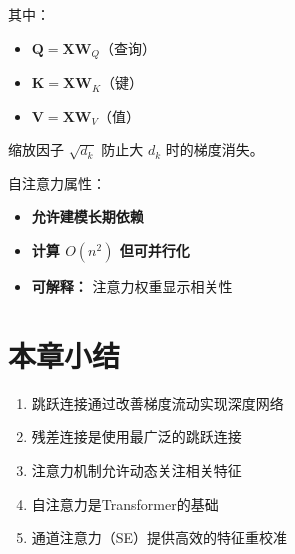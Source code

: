 其中：
\begin{itemize}
    \item $\mathbf{Q} = \mathbf{X}\mathbf{W}_Q$（查询）
    \item $\mathbf{K} = \mathbf{X}\mathbf{W}_K$（键）
    \item $\mathbf{V} = \mathbf{X}\mathbf{W}_V$（值）
\end{itemize}

缩放因子 $\sqrt{d_k}$ 防止大 $d_k$ 时的梯度消失。

自注意力属性：
\begin{itemize}
    \item \textbf{允许建模长期依赖}
    \item \textbf{计算 $O(n^2)$ 但可并行化}
    \item \textbf{可解释：} 注意力权重显示相关性
\end{itemize}

\section{本章小结}

\begin{enumerate}
    \item 跳跃连接通过改善梯度流动实现深度网络
    \item 残差连接是使用最广泛的跳跃连接
    \item 注意力机制允许动态关注相关特征
    \item 自注意力是Transformer的基础
    \item 通道注意力（SE）提供高效的特征重校准
\end{enumerate}
